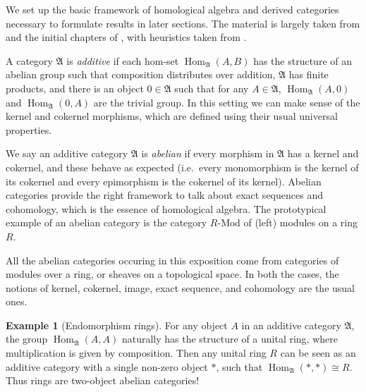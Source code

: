 \documentclass[a4paper]{article}
\theoremstyle{definition}
\newtheorem{example}[defn]{Example}
\theoremstyle{remark}
\newcommand{\Mod}{\ensuremath{\text{-Mod}}}
\DeclareMathOperator{\Hom}{\text{Hom}}
\begin{document}
We set up the basic framework of homological algebra and derived
categories necessary to formulate results in later sections. The material is
largely taken from  and the initial
chapters of , with heuristics taken
from .

A category \(\mathfrak{A}\) is \textit{additive} if each hom-set
\(\Hom_\mathfrak{A}(A,B)\) has the structure of an abelian group such that
composition distributes over addition, \(\mathfrak{A}\) has finite products, and
there is an object \(0\in \mathfrak{A}\) such that for any \(A\in
\mathfrak{A}\), \(\Hom_\mathfrak{A}(A,0)\) and \(\Hom_\mathfrak{A}(0,A)\) are
the trivial group. In this setting we can make sense of the kernel and cokernel
morphisms, which are defined using their usual universal properties.

We say an additive category \(\mathfrak{A}\) is \textit{abelian} if every
morphism in \(\mathfrak{A}\) has a kernel and cokernel, and these behave as
expected (i.e.\ every monomorphism is the kernel of its cokernel and every
epimorphism is the cokernel of its kernel). Abelian categories provide the right
framework to talk about exact sequences and cohomology, which is the essence of
homological algebra. The prototypical example of an abelian category is the
category \(R\Mod\) of (left) modules on a ring \(R\). 

All the abelian categories occuring in this exposition come from categories of
modules over a ring, or sheaves on a topological space. In both the cases, the
notions of kernel, cokernel, image, exact sequence, and cohomology are the usual
ones.

\begin{example}[Endomorphism rings] \label{ring-additive}
    For any object \(A\) in an additive category \(\mathfrak{A}\), the group
    \(\Hom_\mathfrak{A}(A,A)\) naturally has the structure of a unital ring, where
    multiplication is given by composition. Then any unital ring \(R\) can be
    seen as an additive category with a single non-zero object \(\ast\), such
    that \(\Hom_\mathfrak{A}(\ast,\ast)\cong R\). Thus rings are two-object
    abelian categories!  
\end{example}
\end{document}
